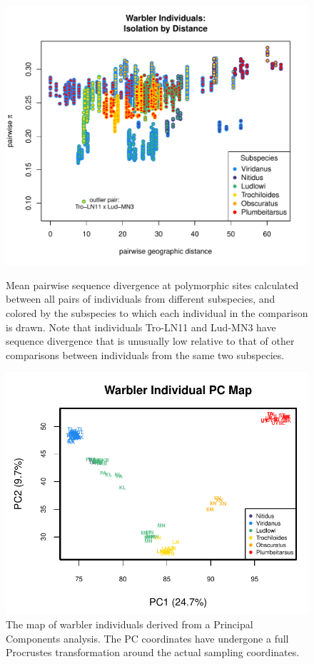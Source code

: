 \documentclass[10pt,letterpaper]{article}
\begin{document}
\begin{figure}
\centering
	{\includegraphics[width=\textwidth]{../figs/warblers/warb_ind_pairwise_pi.pdf}}
	\caption{Mean pairwise sequence divergence at polymorphic sites calculated between all pairs of individuals from different subspecies, and colored by the subspecies to which each individual in the comparison is drawn.  Note that individuals Tro-LN11 and Lud-MN3 have sequence divergence that is unusually low relative to that of other comparisons between individuals from the same two subspecies.}\label{sfig:warb_ind_pwp}
\end{figure}

\begin{figure}
	\centering
	\includegraphics[width=\textwidth]{../figs/warblers/warb_ind_PC_map.pdf}
	\caption{The map of warbler individuals derived from a Principal Components analysis.  The PC coordinates have undergone a full Procrustes transformation around the actual sampling coordinates.}
	\label{sfig:warb_ind_PC_map}
\end{figure}
\end{document}
